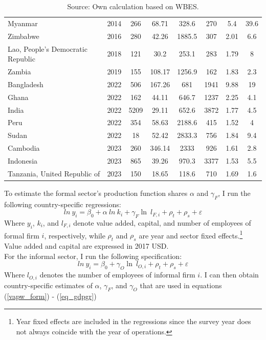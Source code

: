 \documentclass[letterpaper, 12pt]{article}
\begin{document}
\begin{table}[ht!]
\begin{tabular}{ll|ccc|ccc}
Myanmar & 2014 & 266 & 68.71 & 328.6 & 270 & 5.4 & 39.6 \\
Zimbabwe & 2016 & 280 & 42.26 & 1885.5 & 307 & 2.01 & 6.6 \\
Lao, People's Democratic Republic & 2018 & 121 & 30.2 & 253.1 & 283 & 1.79 & 8 \\
Zambia & 2019 & 155 & 108.17 & 1256.9 & 162 & 1.83 & 2.3 \\
Bangladesh & 2022 & 506 & 167.26 & 681 & 1941 & 9.88 & 19 \\
Ghana & 2022 & 162 & 44.11 & 646.7 & 1237 & 2.25 & 4.1 \\
India & 2022 & 5209 & 29.11 & 652.6 & 3872 & 1.77 & 4.5 \\
Peru & 2022 & 354 & 58.63 & 2188.6 & 415 & 1.52 & 4 \\
Sudan & 2022 & 18 & 52.42 & 2833.3 & 756 & 1.84 & 9.4 \\
Cambodia & 2023 & 260 & 346.14 & 2333 & 926 & 1.61 & 2.8 \\
Indonesia & 2023 & 865 & 39.26 & 970.3 & 3377 & 1.53 & 5.5 \\
Tanzania, United Republic of & 2023 & 150 & 18.65 & 118.6 & 710 & 1.69 & 1.6 \\
\hline
\hline
\end{tabular}
    \caption*{Source: Own calculation based on WBES.}
\end{table}

\noindent
To estimate the formal sector's production function shares $\alpha$ and $\gamma_F$, I run the following country-specific regressions:
\begin{equation}\label{eq_prod_form}
    ln \ y_i = \beta_0 + \alpha \ ln \ k_i + \gamma_F \ln \ l_{F,i}+\rho_t+\rho_s+\varepsilon
\end{equation}
\noindent
Where $y_i$, $k_i$, and $l_{F,i}$ denote value added, capital, and number of employees of formal firm $i$, respectively, while $\rho_t$ and $\rho_s$ are year and sector fixed effects.\footnote{Year fixed effects are included in the regressions since the survey year does not always coincide with the year of operations.} Value added and capital are expressed in 2017 USD. 
\\For the informal sector, I run the following specification:
\begin{equation}\label{eq_prod_info}
    ln \ y_i = \beta_0 + \gamma_O \ln \ l_{O,i}+\rho_t+\rho_s+\varepsilon
\end{equation}
Where $l_{O,i}$ denotes the number of employees of informal firm $i$.
I can then obtain country-specific estimates of $\alpha$, $\gamma_{F}$, and $\gamma_{O}$ that are used in equations (\ref{vapw_form}) - (\ref{eq_gdpgr})
\end{document}
